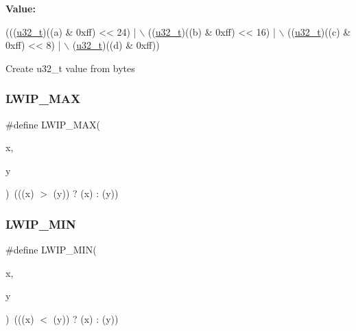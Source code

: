 {\bfseries Value\+:}
\begin{DoxyCode}
(((\hyperlink{group__compiler__abstraction_ga4c14294869aceba3ef9d4c0c302d0f33}{u32\_t})((a) & 0xff) << 24) | \(\backslash\)
                               ((\hyperlink{group__compiler__abstraction_ga4c14294869aceba3ef9d4c0c302d0f33}{u32\_t})((b) & 0xff) << 16) | \(\backslash\)
                               ((\hyperlink{group__compiler__abstraction_ga4c14294869aceba3ef9d4c0c302d0f33}{u32\_t})((c) & 0xff) << 8)  | \(\backslash\)
                                (\hyperlink{group__compiler__abstraction_ga4c14294869aceba3ef9d4c0c302d0f33}{u32\_t})((d) & 0xff))
\end{DoxyCode}
Create u32\+\_\+t value from bytes \mbox{\label{openmote-cc2538_2lwip_2src_2include_2lwip_2def_8h_a21ea174d374106caeafb4aa3a24fbd2b}} 
\subsubsection{\texorpdfstring{L\+W\+I\+P\+\_\+\+M\+AX}{LWIP\_MAX}}
{\footnotesize\ttfamily \#define L\+W\+I\+P\+\_\+\+M\+AX(\begin{DoxyParamCaption}\item[{}]{x,  }\item[{}]{y }\end{DoxyParamCaption})~(((x) $>$ (y)) ? (x) \+: (y))}

\mbox{\label{openmote-cc2538_2lwip_2src_2include_2lwip_2def_8h_a748f5df614a3fc989e8900fd229d6e4e}} 
\subsubsection{\texorpdfstring{L\+W\+I\+P\+\_\+\+M\+IN}{LWIP\_MIN}}
{\footnotesize\ttfamily \#define L\+W\+I\+P\+\_\+\+M\+IN(\begin{DoxyParamCaption}\item[{}]{x,  }\item[{}]{y }\end{DoxyParamCaption})~(((x) $<$ (y)) ? (x) \+: (y))}

